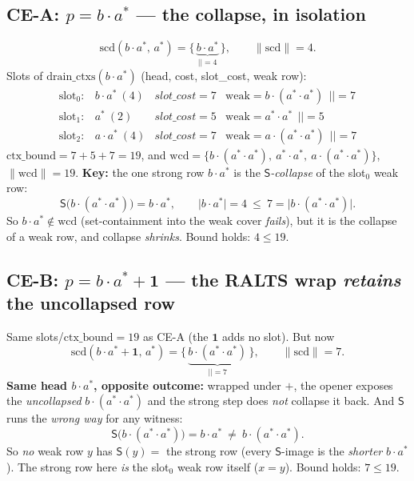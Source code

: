 \documentclass{article}
\newcommand{\rs}[1]{\lvert #1\rvert}                 %
\newcommand{\rss}[1]{\lVert #1\rVert}                %
\newcommand{\sd}{\mathrm{scd}}                       %
\newcommand{\wcd}{\mathrm{wcd}}                        %
\newcommand{\ctxb}{\mathrm{ctx\_bound}}
\newcommand{\dctx}{\mathrm{drain\_ctxs}}
\newcommand{\Strong}{\mathsf{S}}                     %
\newcommand{\seq}{\cdot}
\newcommand{\alt}{+}
\newcommand{\one}{\mathbf 1}
\begin{document}
\subsection*{CE-A: $p=b\seq a^{*}$ --- the collapse, in isolation}
\[
\sd(b\seq a^{*},\,a^{*}) = \{\,\underbrace{b\seq a^{*}}_{\rs{}=4}\,\},\qquad \rss{\sd}=4.
\]
Slots of $\dctx(b\seq a^{*})$ (head, cost, slot\_cost, weak row):
\[
\begin{array}{llll}
\text{slot}_0: & b\seq a^{*}\ (4) & \textit{slot\_cost}=7 & \mathrm{weak}=b\seq(a^{*}\seq a^{*})\ \ \rs{}=7\\
\text{slot}_1: & a^{*}\ (2) & \textit{slot\_cost}=5 & \mathrm{weak}=a^{*}\seq a^{*}\ \ \rs{}=5\\
\text{slot}_2: & a\seq a^{*}\ (4) & \textit{slot\_cost}=7 & \mathrm{weak}=a\seq(a^{*}\seq a^{*})\ \ \rs{}=7
\end{array}
\]
$\ctxb=7+5+7=19$, and $\wcd=\{b\seq(a^{*}\seq a^{*}),\ a^{*}\seq a^{*},\ a\seq(a^{*}\seq a^{*})\}$, $\rss{\wcd}=19$.
\textbf{Key:} the one strong row $b\seq a^{*}$ is the \emph{$\Strong$-collapse} of the slot$_0$ weak row:
\[
\Strong\bigl(b\seq(a^{*}\seq a^{*})\bigr)=b\seq a^{*},\qquad \rs{b\seq a^{*}}=4\ \le\ 7=\rs{b\seq(a^{*}\seq a^{*})}.
\]
So $b\seq a^{*}\notin\wcd$ (set-containment into the weak cover \emph{fails}), but it is the collapse of a
weak row, and collapse \emph{shrinks}. Bound holds: $4\le19$.

\subsection*{CE-B: $p=b\seq a^{*}\alt\one$ --- the RALTS wrap \emph{retains} the uncollapsed row}
Same slots/$\ctxb=19$ as CE-A (the $\one$ adds no slot). But now
\[
\sd(b\seq a^{*}\alt\one,\,a^{*}) = \{\,\underbrace{b\seq(a^{*}\seq a^{*})}_{\rs{}=7}\,\},\qquad \rss{\sd}=7 .
\]
\textbf{Same head $b\seq a^{*}$, opposite outcome:} wrapped under $\alt$, the opener exposes the
\emph{uncollapsed} $b\seq(a^{*}\seq a^{*})$ and the strong step does \emph{not} collapse it back.
And $\Strong$ runs the \emph{wrong way} for any witness:
\[
\Strong\bigl(b\seq(a^{*}\seq a^{*})\bigr)=b\seq a^{*}\ \neq\ b\seq(a^{*}\seq a^{*}).
\]
So \emph{no} weak row $y$ has $\Strong(y)=$ the strong row (every $\Strong$-image is the \emph{shorter}
$b\seq a^{*}$). The strong row here \emph{is} the slot$_0$ weak row itself ($x=y$). Bound holds: $7\le19$.
\end{document}
